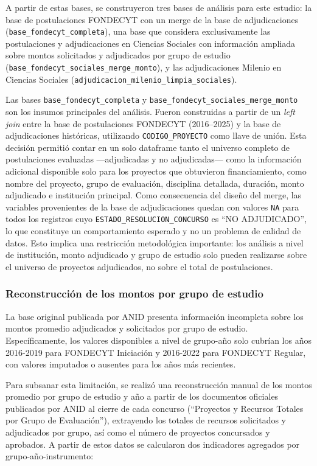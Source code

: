 \documentclass[
  12pt,
  letterpaper,
]{article}
\begin{document}
A partir de estas bases, se construyeron tres bases de análisis para
este estudio: la base de postulaciones FONDECYT con un merge de la base
de adjudicaciones (\texttt{base\_fondecyt\_completa}), una base que
considera exclusivamente las postulaciones y adjudicaciones en Ciencias
Sociales con información ampliada sobre montos solicitados y adjudicados
por grupo de estudio (\texttt{base\_fondecyt\_sociales\_merge\_monto}),
y las adjudicaciones Milenio en Ciencias Sociales
(\texttt{adjudicacion\_milenio\_limpia\_sociales}).

Las bases \texttt{base\_fondecyt\_completa} y
\texttt{base\_fondecyt\_sociales\_merge\_monto} son los insumos
principales del análisis. Fueron construidas a partir de un \emph{left
join} entre la base de postulaciones FONDECYT (2016--2025) y la base de
adjudicaciones históricas, utilizando \texttt{CODIGO\_PROYECTO} como
llave de unión. Esta decisión permitió contar en un solo dataframe tanto
el universo completo de postulaciones evaluadas ---adjudicadas y no
adjudicadas--- como la información adicional disponible solo para los
proyectos que obtuvieron financiamiento, como nombre del proyecto, grupo
de evaluación, disciplina detallada, duración, monto adjudicado e
institución principal. Como consecuencia del diseño del merge, las
variables provenientes de la base de adjudicaciones quedan con valores
\texttt{NA} para todos los registros cuyo
\texttt{ESTADO\_RESOLUCION\_CONCURSO} es ``NO ADJUDICADO'', lo que
constituye un comportamiento esperado y no un problema de calidad de
datos. Esto implica una restricción metodológica importante: los
análisis a nivel de institución, monto adjudicado y grupo de estudio
solo pueden realizarse sobre el universo de proyectos adjudicados, no
sobre el total de postulaciones.

\subsubsection{Reconstrucción de los montos por grupo de
estudio}\label{reconstrucciuxf3n-de-los-montos-por-grupo-de-estudio}

La base original publicada por ANID presenta información incompleta
sobre los montos promedio adjudicados y solicitados por grupo de
estudio. Específicamente, los valores disponibles a nivel de grupo-año
solo cubrían los años 2016-2019 para FONDECYT Iniciación y 2016-2022
para FONDECYT Regular, con valores imputados o ausentes para los años
más recientes.

Para subsanar esta limitación, se realizó una reconstrucción manual de
los montos promedio por grupo de estudio y año a partir de los
documentos oficiales publicados por ANID al cierre de cada concurso
(``Proyectos y Recursos Totales por Grupo de Evaluación''), extrayendo
los totales de recursos solicitados y adjudicados por grupo, así como el
número de proyectos concursados y aprobados. A partir de estos datos se
calcularon dos indicadores agregados por grupo-año-instrumento:
\end{document}
